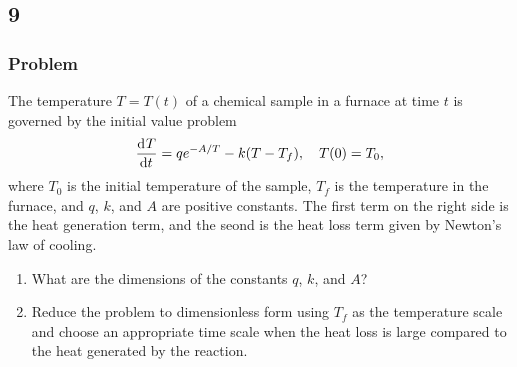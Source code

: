 \documentclass[12pt]{article}
\begin{document}

\newpage
\subsection{9}
\subsubsection*{Problem}

The temperature $T=T(t)$ of a chemical sample in a furnace at time $t$ is
governed by the initial value problem
$$\frac{\mathrm{d}^{} {T}}{\mathrm{d}{t}^{}}=qe^{-A/T}-k(T-T_f),\quad T(0)=T_0,$$ where $T_0$ is the initial
temperature of the sample, $T_f$ is the temperature in the furnace, and $q$,
$k$, and $A$ are positive constants. The first term on the right side is the
heat generation term, and the seond is the heat loss term given by Newton's law
of cooling.
\begin{enumerate}
\item What are the dimensions of the constants $q$, $k$, and $A$?
\item Reduce the problem to dimensionless form using $T_f$ as the temperature
  scale and choose an appropriate time scale when the heat loss is large
  compared to the heat generated by the reaction.
\end{enumerate}
\end{document}
